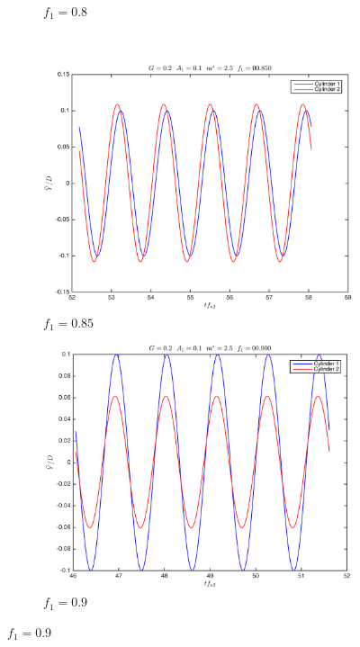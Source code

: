 \begin{figure}[tbp]
\begin{subfigure}[t]{\widthp\textwidth}
		\caption{$ f_1=0.8 $}
		\label{fig:freq0.8}
	\end{subfigure}\\%
	\begin{subfigure}[t]{\widthp\textwidth}
		\centering
		\includegraphics[width=1\linewidth]{Figs/Plotting_g0.20a0.100m2.5zl_r48_00.850_VIV02}
		\caption{$ f_1=0.85 $}
		\label{fig:freq0.85}
	\end{subfigure}%
	\begin{subfigure}[t]{\widthp\textwidth}
		\centering
		\includegraphics[width=1\linewidth]{Figs/Plotting_g0.20a0.100m2.5zl_r48_00.900_VIV02}
		\caption{$ f_1=0.9 $}

\end{subfigure}
\end{figure}
